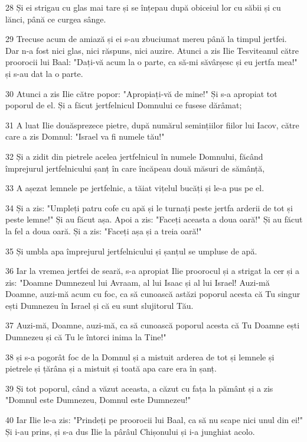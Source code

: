 \par 28 Și ei strigau cu glas mai tare și se înțepau după obiceiul lor cu săbii și cu lănci, până ce curgea sânge.
\par 29 Trecuse acum de amiază și ei s-au zbuciumat mereu până la timpul jertfei. Dar n-a fost nici glas, nici răspuns, nici auzire. Atunci a zis Ilie Tesviteanul către proorocii lui Baal: "Dați-vă acum la o parte, ca să-mi săvârșesc și eu jertfa mea!" și s-au dat la o parte.
\par 30 Atunci a zis Ilie către popor: "Apropiați-vă de mine!" Și s-a apropiat tot poporul de el. Și a făcut jertfelnicul Domnului ce fusese dărâmat;
\par 31 A luat Ilie douăsprezece pietre, după numărul semințiilor fiilor lui Iacov, către care a zis Domnul: "Israel va fi numele tău!"
\par 32 Și a zidit din pietrele acelea jertfelnicul în numele Domnului, făcând împrejurul jertfelnicului șanț în care încăpeau două măsuri de sămânță,
\par 33 A așezat lemnele pe jertfelnic, a tăiat vițelul bucăți și le-a pus pe el.
\par 34 Și a zis: "Umpleți patru cofe cu apă și le turnați peste jertfa arderii de tot și peste lemne!" Și au făcut așa. Apoi a zis: "Faceți aceasta a doua oară!" Și au făcut la fel a doua oară. Și a zis: "Faceți așa și a treia oară!"
\par 35 Și umbla apa împrejurul jertfelnicului și șanțul se umpluse de apă.
\par 36 Iar la vremea jertfei de seară, s-a apropiat Ilie proorocul și a strigat la cer și a zis: "Doamne Dumnezeul lui Avraam, al lui Isaac și al lui Israel! Auzi-mă Doamne, auzi-mă acum cu foc, ca să cunoască astăzi poporul acesta că Tu singur ești Dumnezeu în Israel și că eu sunt slujitorul Tău.
\par 37 Auzi-mă, Doamne, auzi-mă, ca să cunoască poporul acesta că Tu Doamne ești Dumnezeu și că Tu le întorci inima la Tine!"
\par 38 și s-a pogorât foc de la Domnul și a mistuit arderea de tot și lemnele și pietrele și țărâna și a mistuit și toată apa care era în șanț.
\par 39 Și tot poporul, când a văzut aceasta, a căzut cu fața la pământ și a zis "Domnul este Dumnezeu, Domnul este Dumnezeu!"
\par 40 Iar Ilie le-a zis: "Prindeți pe proorocii lui Baal, ca să nu scape nici unul din ei!" Și i-au prins, și s-a dus Ilie la pârâul Chișonului și i-a junghiat acolo.
